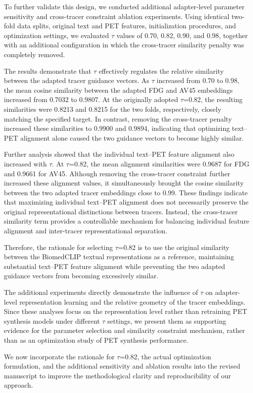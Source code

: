 {To further validate this design, we conducted additional adapter-level parameter sensitivity and cross-tracer constraint ablation experiments. Using identical two-fold data splits, original text and PET features, initialization procedures, and optimization settings, we evaluated \ensuremath{\tau} values of 0.70, 0.82, 0.90, and 0.98, together with an additional configuration in which the cross-tracer similarity penalty was completely removed.

The results demonstrate that \ensuremath{\tau} effectively regulates the relative similarity between the adapted tracer guidance vectors. As \ensuremath{\tau} increased from 0.70 to 0.98, the mean cosine similarity between the adapted FDG and AV45 embeddings increased from 0.7032 to 0.9807. At the originally adopted \ensuremath{\tau}=0.82, the resulting similarities were 0.8213 and 0.8215 for the two folds, respectively, closely matching the specified target. In contrast, removing the cross-tracer penalty increased these similarities to 0.9900 and 0.9894, indicating that optimizing text–PET alignment alone caused the two guidance vectors to become highly similar.

Further analysis showed that the individual text–PET feature alignment also increased with \ensuremath{\tau}. At \ensuremath{\tau}=0.82, the mean alignment similarities were 0.9687 for FDG and 0.9661 for AV45. Although removing the cross-tracer constraint further increased these alignment values, it simultaneously brought the cosine similarity between the two adapted tracer embeddings close to 0.99. These findings indicate that maximizing individual text–PET alignment does not necessarily preserve the original representational distinctions between tracers. Instead, the cross-tracer similarity term provides a controllable mechanism for balancing individual feature alignment and inter-tracer representational separation.

Therefore, the rationale for selecting \ensuremath{\tau}=0.82 is to use the original similarity between the BiomedCLIP textual representations as a reference, maintaining substantial text–PET feature alignment while preventing the two adapted guidance vectors from becoming excessively similar.

The additional experiments directly demonstrate the influence of \ensuremath{\tau} on adapter-level representation learning and the relative geometry of the tracer embeddings. Since these analyses focus on the representation level rather than retraining PET synthesis models under different \ensuremath{\tau} settings, we present them as supporting evidence for the parameter selection and similarity constraint mechanism, rather than as an optimization study of PET synthesis performance.

We now incorporate the rationale for \ensuremath{\tau}=0.82, the actual optimization formulation, and the additional sensitivity and ablation results into the revised manuscript to improve the methodological clarity and reproducibility of our approach.}

